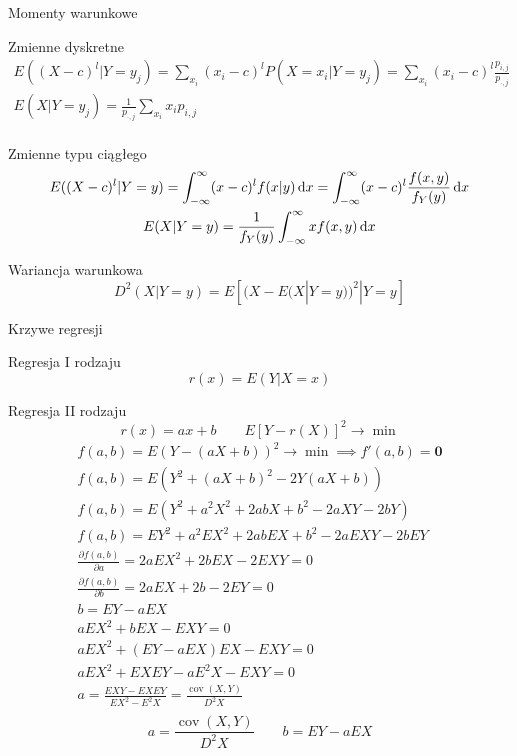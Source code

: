 \documentclass{mp}
\newcommand{\dd}[1]{\partial#1}
\DeclareMathOperator{\cov}{cov}
\begin{document}
\begin{frame}{Momenty warunkowe}
{
\begin{block}{Zmienne dyskretne}
\begin{gather*}
E((X-c)^l|Y=y_j)=\sum_{x_i} (x_i-c)^lP(X=x_i|Y=y_j)=\sum_{x_i} (x_i-c)^l\frac{p_{i,j}}{p_{\cdot,j}} \\
E(X|Y=y_j)=\frac{1}{p_{\cdot,j}}\sum_{x_i} x_ip_{i,j} \\
\end{gather*}
\end{block}
}
{
\begin{block}{Zmienne typu ciągłego}
\begin{gather*}
E((X-c)^l|Y=y)=\int_{-\infty}^\infty (x-c)^lf(x|y)\,\text{d}x=\int_{-\infty}^\infty (x-c)^l\frac{f(x,y)}{f_Y(y)}\,\text{d}x \\
E(X|Y=y)=\frac{1}{f_Y(y)}\int_{-\infty}^\infty xf(x,y)\,\text{d}x
\end{gather*}
\end{block}
}
{
\begin{block}{Wariancja warunkowa}
\[ D^2(X|Y=y)=E\left[(X-E(X|Y=y))^2|Y=y\right] \]
\end{block}
}
\end{frame}

\begin{frame}{Krzywe regresji}
\begin{block}{Regresja I rodzaju}
\[ r(x)=E(Y|X=x)  \]
\end{block}
\pause
\begin{block}{Regresja II rodzaju}
\[ r(x)=ax+b \qquad E\left[Y-r(X)\right]^2\to\min \]
\note
{
	\begin{gather*}
	f(a,b)=E(Y-(aX+b))^2\to\min \implies f'(a,b)=\bm{0} \\
	f(a,b)=E(Y^2+(aX+b)^2-2Y(aX+b))\\
	f(a,b)=E(Y^2+a^2X^2+2abX+b^2-2aXY-2bY)\\
	f(a,b)=EY^2+a^2EX^2+2abEX+b^2-2aEXY-2bEY \\
	\frac{\dd{f(a,b)}}{\dd{a}}=2aEX^2+2bEX-2EXY=0 \\
	\frac{\dd{f(a,b)}}{\dd{b}}=2aEX+2b-2EY=0 \\
	b=EY-aEX \\
	aEX^2+bEX-EXY=0 \\
	aEX^2+(EY-aEX)EX-EXY=0 \\
	aEX^2+EXEY-aE^2X-EXY=0 \\
	a=\frac{EXY-EXEY}{EX^2-E^2X}=\frac{\cov(X,Y)}{D^2X} \\
	\end{gather*}
}
\pause
\[ a=\frac{\cov(X,Y)}{D^2X} \qquad b=EY-aEX \]
\end{block}
\end{frame}
\end{document}
